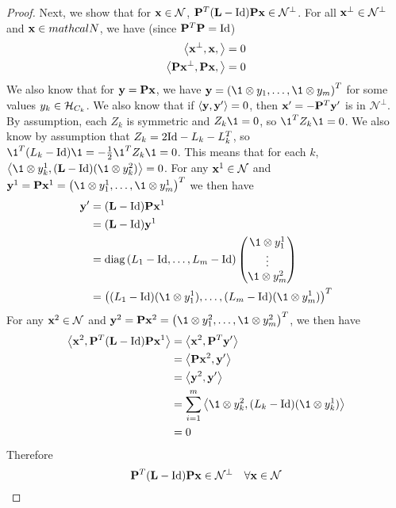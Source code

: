 \begin{proof}
Next, we show that for $\mathbf{x} \in \mathcal{N}$, $\mathbf{P}^T(\mathbf{L}-\mathrm{Id})\mathbf{P}\mathbf{x} \in \mathcal{N}^\perp$.
For all $\mathbf{x}^\perp \in \mathcal{N}^\perp$ and $\mathbf{x} \in mathcal{N}$, we have (since $\mathbf{P}^T \mathbf{P} = \mathrm{Id}$)
\begin{align}
    \left\langle \mathbf{x}^\perp, \mathbf{x}, \right\rangle &= 0 \\
    \left\langle \mathbf{P}\mathbf{x}^\perp, \mathbf{P}\mathbf{x}, \right\rangle &= 0 
\end{align}
We also know that for $\mathbf{y} = \mathbf{P}\mathbf{x}$, we have $\v{y} = \left(\1 \otimes y_1, \dots, \1 \otimes y_m\right)^T$ for some values $y_k \in \mathcal{H}_{C_k}$.
We also know that if $\left\langle \mathbf{y}, \mathbf{y}'\right\rangle = 0$, then $\mathbf{x}' = -\mathbf{P}^T \mathbf{y}'$ is in $\mathcal{N}^\perp$.
By assumption, each $Z_k$ is symmetric and $Z_k\1=0$, so $\1^T Z_k \1 = 0$.
We also know by assumption that $Z_k = 2\mathrm{Id} - L_k - L_k^T$, so $\1^T (L_k - \I)\1 = -\frac{1}{2}\1^T Z_k \1 = 0$.
This means that for each $k$, $\left\langle \1 \otimes y^1_k, (\v{L} - \I)(\1 \otimes y^2_k)\right\rangle = 0$.
For any $\mathbf{x}^1 \in \mathcal{N}$ and $\v{y}^1 = \v{P}\v{x}^1 = \left(\1 \otimes y_1^1, \dots, \1 \otimes y_m^1\right)^T$ we then have 
\begin{align}
\v{y}' &= (\v{L} - \I)\v{P}\v{x}^1 \\ 
&= (\v{L} - \I)\v{y}^1 \\ 
&= \diag\left(L_1 - \I, \dots, L_m - \I\right) \begin{pmatrix}
    \1 \otimes y_1^1 \\
    \vdots \\
    \1 \otimes y_m^2
\end{pmatrix} \\ 
&= \left((L_1 - \I)(\1 \otimes y_1^1), \dots, (L_m -\I)(\1 \otimes y_m^1)\right)^T
\end{align}
For any $\mathbf{x}^2 \in \mathcal{N}$ and $\v{y}^2 = \v{P}\v{x}^2 = \left(\1 \otimes y_1^2, \dots, \1 \otimes y_m^2\right)^T$, we then have
\begin{align}    
    \left\langle \v{x}^2, \v{P}^T (\v{L} - \I)\v{P}\v{x}^1 \right\rangle &= \left\langle \v{x}^2, \v{P}^T \v{y}' \right\rangle \\
    &= \left\langle \v{P}\v{x}^2, \v{y}' \right\rangle \\
    &= \left\langle \v{y}^2, \v{y}' \right\rangle \\
    &= \sum_{i=1}^m \left\langle \1 \otimes y_k^2, (L_k - \I)(\1 \otimes y_k^1) \right\rangle \\
    &= 0
\end{align}
Therefore 
\begin{equation}\label{LIx_in_NT}
\mathbf{P}^T(\mathbf{L}-\mathrm{Id})\mathbf{P}\mathbf{x} \in \mathcal{N}^\perp \quad \forall \mathbf{x} \in \mathcal{N}
\end{equation}


\end{proof}
